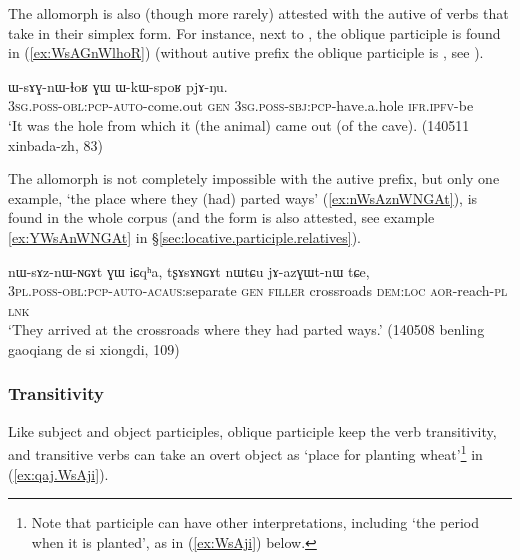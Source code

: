 The allomorph  is also (though more rarely) attested with the autive  of verbs that take  in their simplex form. For instance, next to , the oblique participle  is found in (\ref{ex:WsAGnWlhoR}) (without autive prefix the oblique participle is , see ).

\begin{exe}
\ex \label{ex:WsAGnWlhoR}
\gll ɯ-sɤɣ-nɯ-ɬoʁ ɣɯ ɯ-kɯ-spoʁ pjɤ-ŋu.  \\
\textsc{3sg}.\textsc{poss}-\textsc{obl}:\textsc{pcp}-\textsc{auto}-come.out \textsc{gen} \textsc{3sg}.\textsc{poss}-\textsc{sbj}:\textsc{pcp}-have.a.hole \textsc{ifr}.\textsc{ipfv}-be \\
\glt `It was the hole from which it (the animal) came out (of the cave).  (140511 xinbada-zh, 83)
\end{exe} 

The  allomorph is not completely impossible with the autive  prefix, but only one example,  `the place where they (had) parted ways' (\ref{ex:nWsAznWNGAt}), is found in the whole corpus (and the form  is also attested, see example \ref{ex:YWsAnWNGAt} in §\ref{sec:locative.participle.relatives}).

\begin{exe}
\ex \label{ex:nWsAznWNGAt}
\gll  nɯ-sɤz-nɯ-ɴɢɤt ɣɯ iɕqʰa, tʂɤsɤɴɢɤt nɯtɕu jɤ-azɣɯt-nɯ tɕe, \\
\textsc{3pl}.\textsc{poss}-\textsc{obl}:\textsc{pcp}-\textsc{auto}-\textsc{acaus}:separate \textsc{gen} \textsc{filler}  crossroads \textsc{dem}:\textsc{loc} \textsc{aor}-reach-\textsc{pl} \textsc{lnk} \\
\glt `They arrived at the crossroads where they had parted ways.' (140508 benling gaoqiang de si xiongdi, 109)
\end{exe} 

\subsubsection{Transitivity} \label{sec:oblique.participle.transitivity}
Like subject and object participles, oblique participle keep the verb transitivity, and transitive verbs can take an overt object as  `place for planting wheat'\footnote{Note that participle  can have other interpretations, including `the period when it is planted', as in (\ref{ex:WsAji}) below. } in (\ref{ex:qaj.WsAji}).

